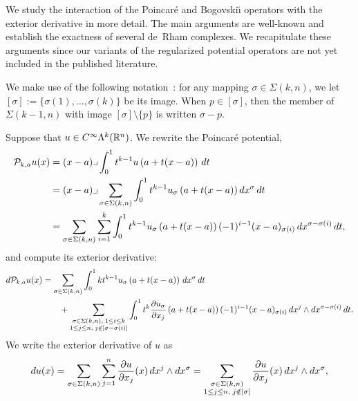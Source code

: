 \documentclass[10pt,a4paper]{article}
\begin{document}
We study the interaction of the Poincar\'e and Bogovski\u{\i} operators with the exterior derivative in more detail.
% 
The main arguments are well-known and establish the exactness of several de~Rham complexes. 
We recapitulate these arguments since our variants of the regularized potential operators are not yet included in the published literature. 

We make use of the following notation~\cite{licht2022basis}:
for any mapping $\sigma \in \Sigma(k,n)$, we let $[\sigma] := \{ \sigma(1), \dots, \sigma(k) \}$ be its image. 
When $p \in [\sigma]$, then the member of $\Sigma(k-1,n)$ with image $[\sigma] \setminus \{p\}$ is written $\sigma-p$.

Suppose that $u \in C^{\infty}\Lambda^{k}({\mathbb R}^n)$.
We rewrite the Poincar\'e potential,
\begin{align*}
    {\mathcal P}_{k,a} u(x) 
    &= 
    (x-a)\lrcorner \int_{0}^{1} t^{k-1} u\left(a+t(x-a)\right)\,dt 
    \\&
    = 
    (x-a)\lrcorner 
    \sum_{\sigma \in \Sigma(k,n)}
    \int_{0}^{1} 
    t^{k-1} u_{\sigma}\left(a+t(x-a)\right) dx^{\sigma} \,dt 
    \\&
    = 
    \sum_{\sigma \in \Sigma(k,n)} \sum_{i=1}^{k}
    \int_{0}^{1} 
    t^{k-1} u_{\sigma}\left(a+t(x-a)\right) (-1)^{i-1} (x-a)_{\sigma(i) } \,dx^{\sigma-\sigma(i)} \,dt 
    ,
\end{align*}
and compute its exterior derivative:
\begin{align*}
    d {\mathcal P}_{k,a} u(x) 
    &= 
    \sum_{\sigma \in \Sigma(k,n)} 
    \int_{0}^{1} 
    k t^{k-1} u_{\sigma}\left(a+t(x-a)\right) \,dx^{\sigma} \,dt 
    \\&\qquad
    + 
    \sum_{\substack{ \sigma \in \Sigma(k,n), \; 1 \leq i \leq k \\ 1 \leq j \leq n, \; j \notin [\sigma-\sigma(i)] }}
    \int_{0}^{1} 
    t^{k} \frac{ \partial u_{\sigma} }{\partial x_{j}}\left(a+t(x-a)\right) (-1)^{i-1} (x-a)_{\sigma(i) } \,dx^{j} \wedge dx^{\sigma-\sigma(i)} \,dt 
    .
\end{align*}
We write the exterior derivative of $u$ as 
\begin{align}\label{math:exteriorderivative_of_u_in_hodgediscussion}
    d u(x)
    =
    \sum_{\sigma \in \Sigma(k,n)} \sum_{j=1}^{n}
    \frac{ \partial u }{\partial x_{j}}(x) \,dx^{j} \wedge dx^{\sigma} 
    =
    \sum_{\substack{ \sigma \in \Sigma(k,n) \\ 1 \leq j \leq n, \; j \notin [\sigma] }}
    \frac{ \partial u }{\partial x_{j}}(x) \,dx^{j} \wedge dx^{\sigma} 
    ,
\end{align}
\end{document}
